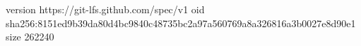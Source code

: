 version https://git-lfs.github.com/spec/v1
oid sha256:8151ed9b39da80d4bc9840c48735bc2a97a560769a8a326816a3b0027e8d90e1
size 262240
